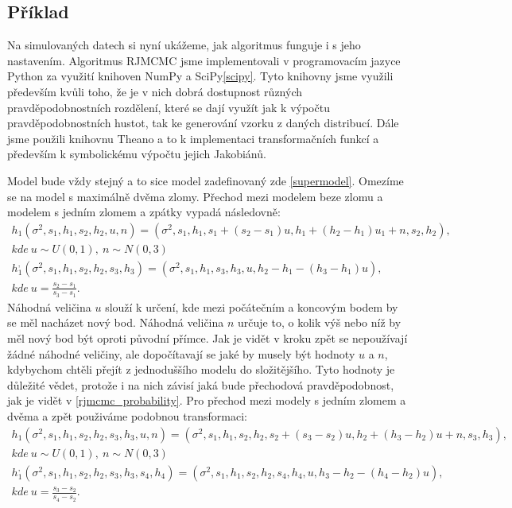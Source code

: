 \documentclass[czech,master,public,dept470,male,cpdeclaration,oneside, python]{diploma}
\begin{document}
\subsection{Příklad}
Na simulovaných datech si nyní ukážeme, jak algoritmus funguje i s jeho nastavením. Algoritmus RJMCMC jsme implementovali v programovacím jazyce Python\cite{python} za využití knihoven NumPy\cite{numpy} a SciPy\ref{scipy}. Tyto knihovny jsme využili především kvůli toho, že je v nich dobrá dostupnost různých pravděpodobnostních rozdělení, které se dají využít jak k výpočtu pravděpodobnostních hustot, tak ke generování vzorku z daných distribucí. Dále jsme použili knihovnu Theano\cite{theano} a to k implementaci transformačních funkcí a především k symbolickému výpočtu jejich Jakobiánů. \par
Model bude vždy stejný a to sice model zadefinovaný zde \ref{supermodel}. Omezíme se na model s maximálně dvěma zlomy. Přechod mezi modelem beze zlomu a modelem s jedním zlomem  a zpátky vypadá následovně:
\begin{align*}
	h_1(\sigma^2, s_1, h_1, s_2, h_2, u, n) = 
	(\sigma^2, s_1, h_1, s_1 + (s_2 - s_1)u, h_1 + (h_2 - h_1)u_1 + n, s_2, h_2), \\
	 kde\ u \sim U(0, 1),\
	n \sim N(0, 3) \\
	h_1^{,}(\sigma^2, s_1, h_1, s_2, h_2, s_3, h_3) = 
	(\sigma^2, s_1, h_1, s_3, h_3, u, h_2 - h_1 - (h_3 - h_1)u), \\ 
	kde\ u = \frac{s_2 - s_1}{s_3 - s_1}.
\end{align*}
Náhodná veličina $u$ slouží k určení, kde mezi počátečním a koncovým bodem by se měl nacházet nový bod. Náhodná veličina $n$ určuje to, o kolik výš nebo níž by měl nový bod být oproti původní přímce. Jak je vidět v kroku zpět se nepoužívají žádné náhodné veličiny, ale dopočítavají se jaké by musely být hodnoty $u$ a $n$, kdybychom chtěli přejít z jednoduššího modelu do složitějšího. Tyto hodnoty je důležité vědet, protože i na nich závisí jaká bude přechodová pravděpodobnost, jak je vidět v \ref{rjmcmc_probability}. Pro přechod mezi modely s jedním zlomem a dvěma a zpět použiváme podobnou transformaci:
\begin{align*}
	h_1(\sigma^2, s_1, h_1, s_2, h_2, s_3, h_3, u, n) = 
	(\sigma^2, s_1, h_1, s_2, h_2, s_2 + (s_3 - s_2)u, h_2 + (h_3 - h_2)u + n, s_3, h_3), \\
	kde\ u \sim U(0, 1),\
	n \sim N(0, 3) \\
	h_1^{,}(\sigma^2, s_1, h_1, s_2, h_2, s_3, h_3, s_4, h_4) = 
	(\sigma^2, s_1, h_1, s_2, h_2, s_4, h_4, u, h_3 - h_2 - (h_4 - h_2)u), \\ 
	kde\ u = \frac{s_3 - s_2}{s_4 - s_2}.
\end{align*}
\end{document}
